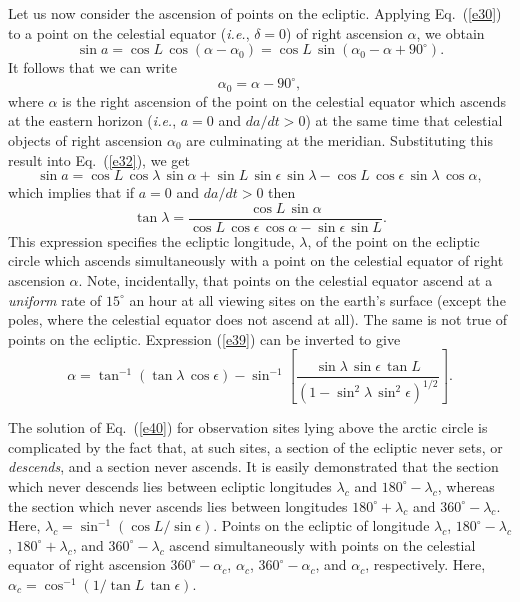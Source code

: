 Let us now consider the ascension of points on the ecliptic.
Applying Eq.~(\ref{e30}) to a point on the celestial equator ({\em i.e.}, $\delta=0$)
of right ascension $\alpha$, we obtain
\begin{equation}
\sin a = \cos L\,\cos(\alpha - \alpha_0) = \cos L\,\sin (\alpha_0-\alpha + 90^\circ).
\end{equation}
It follows that we can write
\begin{equation}
\alpha_0 = \alpha-90^\circ,
\end{equation}
where $\alpha$ is the right ascension of the point on the celestial equator which
ascends at the eastern horizon ({\em i.e.}, $a=0$ and $da/dt>0$) at the same time that celestial objects of right ascension $\alpha_0$ are culminating at
the meridian. Substituting this result into Eq.~(\ref{e32}), 
we get
\begin{equation}
\sin a= \cos L\,\cos\lambda\,\sin\alpha + \sin L\,\sin\epsilon\,\sin\lambda - \cos L\,\cos\epsilon\,\sin\lambda\,\cos\alpha,
\end{equation}
which implies that if $a=0$ and $da/dt>0$ then
\begin{equation}\label{e39}
\tan \lambda = \frac{\cos L\,\sin \alpha}{\cos L\,\cos\epsilon\,\cos\alpha-\sin\epsilon\,\sin L}.
\end{equation}
This expression 
specifies the ecliptic longitude, $\lambda$, of the point on the ecliptic circle which
ascends simultaneously with a point on the celestial equator of right ascension $\alpha$. 
Note, incidentally, that points on the celestial equator  ascend at a {\em uniform}\/ rate of $15^\circ$ an hour at all viewing sites on the earth's
surface (except the poles, where the celestial equator does not ascend at all). The same is not true of points on the ecliptic. Expression (\ref{e39})
can be inverted to give
\begin{equation}\label{e40}
\alpha = \tan^{-1}(\tan \lambda\,\cos \epsilon) - \sin^{-1}\left[
\frac{\sin \lambda\,\sin \epsilon\,\tan L}{(1-\sin^2\lambda\,\sin^2\epsilon)^{1/2}}\right].
\end{equation}

The solution of Eq.~(\ref{e40}) for observation sites lying above
the arctic circle is complicated by the fact that, at such sites, a section of the ecliptic never
sets, or {\em descends},  and a section never ascends. It is easily demonstrated that the
section which never descends lies between ecliptic longitudes
$\lambda_c$ and $180^\circ-\lambda_c$, whereas the section which
never ascends lies between longitudes $180^\circ+\lambda_c$ and
$360^\circ-\lambda_c$. Here, $\lambda_c=\sin^{-1}(\cos L/\sin\epsilon)$. 
Points on the ecliptic of longitude $\lambda_c$, $180^\circ-\lambda_c$,
$180^\circ+\lambda_c$, and $360^\circ-\lambda_c$ ascend simultaneously
with points on the celestial equator of right ascension
$360^\circ - \alpha_c$, $\alpha_c$, $360^\circ-\alpha_c$, and $\alpha_c$,
respectively. Here, $\alpha_c=\cos^{-1}(1/\tan L\,\tan\epsilon)$. 

